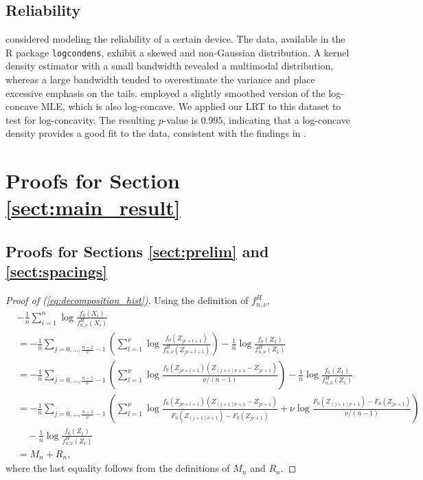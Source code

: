 \documentclass[12pt,letterpaper, twoside, openany]{article}
\theoremstyle{plain}
\begin{document}
\subsection{Reliability}
\cite{dumbgen2009maximum}
considered modeling the reliability of a certain device. The data, available in the R package \verb|logcondens|, exhibit a skewed and non-Gaussian distribution. A kernel density estimator with a small bandwidth revealed a multimodal distribution, whereas a large bandwidth tended to overestimate the variance and place excessive emphasis on the tails.  \cite{dumbgen2009maximum} employed a slightly smoothed version of the log-concave MLE, which is also log-concave. We applied our LRT to this dataset to test for log-concavity. The resulting $p$-value is $0.995$, indicating that a log-concave density provides a good fit to the data, consistent with the findings in \cite{dumbgen2009maximum}. 



\section{Proofs for Section \ref{sect:main_result}}
\subsection{Proofs for Sections \ref{sect:prelim} and \ref{sect:spacings}}
\begin{proof}[Proof of (\ref{eq:decomposition_hist})]
	Using the definition of $f^H_{n,\nu}$,
	\begin{align*}
		&	-\frac{1}{n}\sum^n_{i=1} \log \frac{f_0(X_i)}{f^H_{n,\nu}(X_i)} \\
		&= - \frac{1}{n} \sum_{j=0,\ldots,\frac{n-1}{\nu}-1} 
		\left( \sum^\nu_{l=1} \log \frac{f_0(Z_{j\nu+l+1})}{f^H_{n,\nu}(Z_{j\nu+l+1})}\right) -\frac{1}{n} \log \frac{f_0(Z_1)}{f^H_{n,\nu}(Z_1)}\\
		&= - \frac{1}{n} \sum_{j=0,\ldots, \frac{n-1}{\nu}-1}
		\left( \sum^\nu_{l=1} \log \frac{f_0(Z_{j\nu+l+1})(Z_{(j+1)\nu+1} - Z_{j\nu+1}) }{\nu/(n-1)}\right) -\frac{1}{n} \log \frac{f_0(Z_1)}{f^H_{n,\nu}(Z_1)}\\
		&= - \frac{1}{n} \sum_{j=0,\ldots,\frac{n-1}{\nu} - 1} 
		\left( \sum^\nu_{l=1} \log \frac{f_0(Z_{j\nu+l+1})(Z_{(j+1)\nu+1} - Z_{j\nu+1})}{F_0(Z_{(j+1)\nu+1}) - F_0(Z_{j\nu+1})} + 
		\nu \log \frac{F_0(Z_{(j+1)\nu+1}) - F_0(Z_{j\nu+1})}{\nu/(n-1)} \right) \\
		& \quad -\frac{1}{n} \log \frac{f_0(Z_1)}{f^H_{n,\nu}(Z_1)}\\
		&= M_n + R_n,
	\end{align*}	
where the last equality  follows from the definitions of $M_n$ and $R_n$.
\end{proof}
\end{document}

